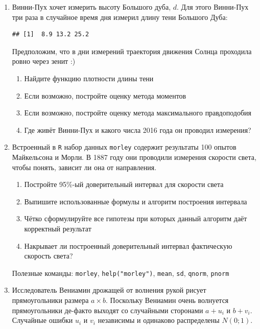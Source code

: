 \documentclass[12pt, a4paper]{article}\usepackage[]{graphicx}\usepackage[]{color}
\makeatletter
\newenvironment{kframe}{%
 \def\at@end@of@kframe{}%
 \ifinner\ifhmode%
  \def\at@end@of@kframe{\end{minipage}}%
  \begin{minipage}{\columnwidth}%
 \fi\fi%
 \def\FrameCommand##1{\hskip\@totalleftmargin \hskip-\fboxsep
 \colorbox{shadecolor}{##1}\hskip-\fboxsep
     \hskip-\linewidth \hskip-\@totalleftmargin \hskip\columnwidth}%
 \MakeFramed {\advance\hsize-\width
   \@totalleftmargin\z@ \linewidth\hsize
   \@setminipage}}%
 {\par\unskip\endMakeFramed%
 \at@end@of@kframe}
\newenvironment{knitrout}{}{} %
\makeatother
\begin{document}
\begin{enumerate}
\item Винни-Пух хочет измерить высоту Большого дуба, $d$. Для этого Винни-Пух три раза в случайное время дня измерил длину тени Большого Дуба:

\begin{knitrout}
\color{fgcolor}\begin{kframe}
\begin{verbatim}
## [1]  8.9 13.2 25.2
\end{verbatim}
\end{kframe}
\end{knitrout}

Предположим, что в дни измерений траектория движения Солнца проходила ровно через зенит :)

\begin{enumerate}
\item Найдите функцию плотности длины тени
\item Если возможно, постройте оценку метода моментов
\item Если возможно, постройте оценку метода максимального правдоподобия
\item Где живёт Винни-Пух и какого числа 2016 года он проводил измерения?
\end{enumerate}

\item Встроенный в \verb|R| набор данных \verb|morley| содержит результаты 100 опытов Майкельсона и Морли. В 1887 году они проводили измерения скорости света, чтобы понять, зависит ли она от направления.

\begin{enumerate}
\item Постройте 95\%-ый доверительный интервал для скорости света
\item Выпишите использованные формулы и алгоритм построения интервала
\item Чётко сформулируйте все гипотезы при которых данный алгоритм даёт корректный результат
\item Накрывает ли построенный доверительный интервал фактическую скорость света?
\end{enumerate}

Полезные команды: \verb|morley|, \verb|help("morley")|, \verb|mean|, \verb|sd|, \verb|qnorm|, \verb|pnorm|



\item  Исследователь Вениамин дрожащей от волнения рукой рисует прямоугольники размера $a\times b$. Поскольку Вениамин очень волнуется прямоугольники де-факто выходят со случайными сторонами $a+u_i$ и $b+v_i$. Случайные ошибки $u_i$ и $v_i$ независимы и одинаково распределены $N(0;1)$.





\end{enumerate}
\end{document}
